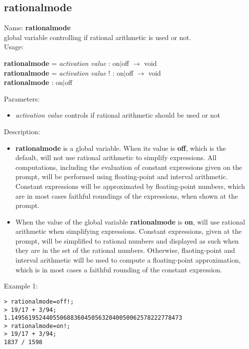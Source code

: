 \subsection{rationalmode}
\label{labrationalmode}
\noindent Name: \textbf{rationalmode}\\
global variable controlling if rational arithmetic is used or not.\\
\noindent Usage: 
\begin{center}
\textbf{rationalmode} = \emph{activation value} : \textsf{on$|$off} $\rightarrow$ \textsf{void}\\
\textbf{rationalmode} = \emph{activation value} ! : \textsf{on$|$off} $\rightarrow$ \textsf{void}\\
\textbf{rationalmode} : \textsf{on$|$off}\\
\end{center}
Parameters: 
\begin{itemize}
\item \emph{activation value} controls if rational arithmetic should be used or not
\end{itemize}
\noindent Description: \begin{itemize}

\item \textbf{rationalmode} is a global variable. When its value is \textbf{off}, which is the default,
   \sollya will not use rational arithmetic to simplify expressions. All computations,
   including the evaluation of constant expressions given on the \sollya prompt,
   will be performed using floating-point and interval arithmetic. Constant expressions
   will be approximated by floating-point numbers, which are in most cases faithful 
   roundings of the expressions, when shown at the prompt. 

\item When the value of the global variable \textbf{rationalmode} is \textbf{on}, \sollya will use 
   rational arithmetic when simplifying expressions. Constant expressions, given 
   at the \sollya prompt, will be simplified to rational numbers and displayed 
   as such when they are in the set of the rational numbers. Otherwise, flaoting-point
   and interval arithmetic will be used to compute a floating-point approximation,
   which is in most cases a faithful rounding of the constant expression.
\end{itemize}
\noindent Example 1: 
\begin{center}\begin{minipage}{15cm}\begin{Verbatim}[frame=single]
> rationalmode=off!;
> 19/17 + 3/94;
1.1495619524405506883604505632040050062578222778473
> rationalmode=on!;
> 19/17 + 3/94;
1837 / 1598
\end{Verbatim}
\end{minipage}\end{center}
